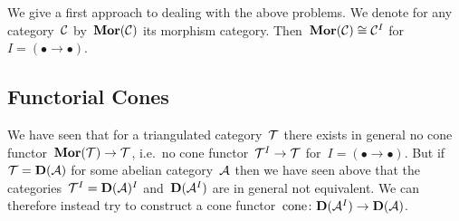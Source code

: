 \documentclass[a4paper,10pt]{scrartcl}
\begin{document}
We give a first approach to dealing with the above problems.
We denote for any category~$\mathcal{C}$ by~$\mathbf{Mor}(\mathcal{C})$ its morphism category.
Then~$\mathbf{Mor}(\mathcal{C}) \cong \mathcal{C}^I$ for~$I = (\bullet \to \bullet)$.



\subsection{Functorial Cones}

We have seen that for a triangulated category~$\mathcal{T}$ there exists in general no cone functor~$\mathbf{Mor}(\mathcal{T}) \to \mathcal{T}$, i.e.\ no cone functor~$\mathcal{T}^I \to \mathcal{T}$ for~$I = (\bullet \to \bullet)$.
But if~$\mathcal{T} = \mathbf{D}(\mathcal{A})$ for some abelian category~$\mathcal{A}$ then we have seen above that the categories~$\mathcal{T}^I = \mathbf{D}(\mathcal{A})^I$ and~$\mathbf{D}(\mathcal{A}^I)$ are in general not equivalent.
We can therefore instead try to construct a cone functor~$\operatorname{cone} \colon \mathbf{D}(\mathcal{A}^I) \to \mathbf{D}(\mathcal{A})$.
\end{document}

